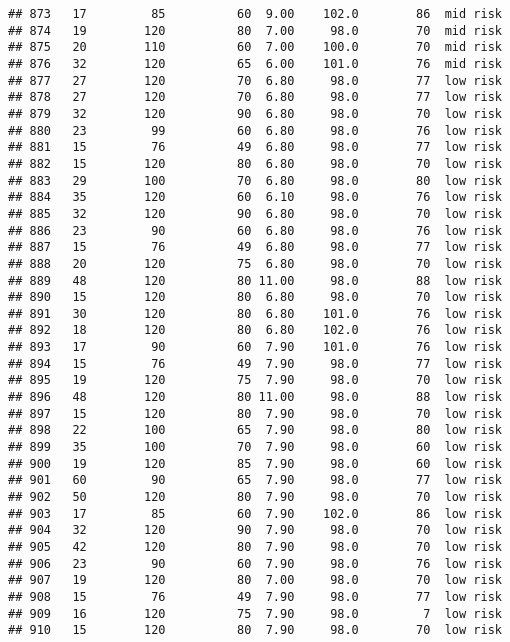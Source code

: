 \documentclass[
  ignorenonframetext,
]{beamer}
\begin{document}
\begin{frame}[fragile]
\begin{verbatim}
## 873   17         85          60  9.00    102.0        86  mid risk
## 874   19        120          80  7.00     98.0        70  mid risk
## 875   20        110          60  7.00    100.0        70  mid risk
## 876   32        120          65  6.00    101.0        76  mid risk
## 877   27        120          70  6.80     98.0        77  low risk
## 878   27        120          70  6.80     98.0        77  low risk
## 879   32        120          90  6.80     98.0        70  low risk
## 880   23         99          60  6.80     98.0        76  low risk
## 881   15         76          49  6.80     98.0        77  low risk
## 882   15        120          80  6.80     98.0        70  low risk
## 883   29        100          70  6.80     98.0        80  low risk
## 884   35        120          60  6.10     98.0        76  low risk
## 885   32        120          90  6.80     98.0        70  low risk
## 886   23         90          60  6.80     98.0        76  low risk
## 887   15         76          49  6.80     98.0        77  low risk
## 888   20        120          75  6.80     98.0        70  low risk
## 889   48        120          80 11.00     98.0        88  low risk
## 890   15        120          80  6.80     98.0        70  low risk
## 891   30        120          80  6.80    101.0        76  low risk
## 892   18        120          80  6.80    102.0        76  low risk
## 893   17         90          60  7.90    101.0        76  low risk
## 894   15         76          49  7.90     98.0        77  low risk
## 895   19        120          75  7.90     98.0        70  low risk
## 896   48        120          80 11.00     98.0        88  low risk
## 897   15        120          80  7.90     98.0        70  low risk
## 898   22        100          65  7.90     98.0        80  low risk
## 899   35        100          70  7.90     98.0        60  low risk
## 900   19        120          85  7.90     98.0        60  low risk
## 901   60         90          65  7.90     98.0        77  low risk
## 902   50        120          80  7.90     98.0        70  low risk
## 903   17         85          60  7.90    102.0        86  low risk
## 904   32        120          90  7.90     98.0        70  low risk
## 905   42        120          80  7.90     98.0        70  low risk
## 906   23         90          60  7.90     98.0        76  low risk
## 907   19        120          80  7.00     98.0        70  low risk
## 908   15         76          49  7.90     98.0        77  low risk
## 909   16        120          75  7.90     98.0         7  low risk
## 910   15        120          80  7.90     98.0        70  low risk

\end{verbatim}
\end{frame}
\end{document}
